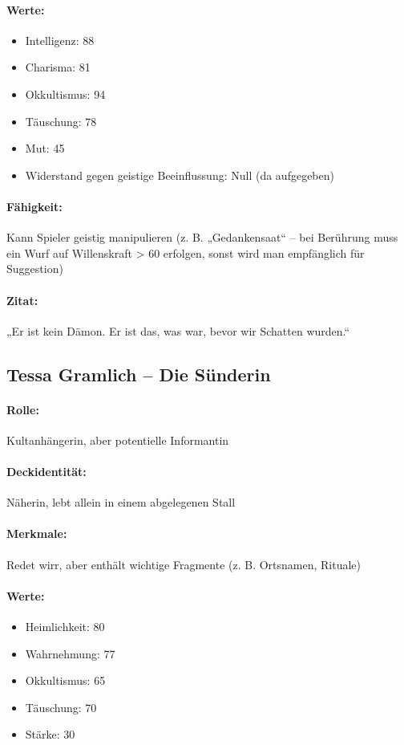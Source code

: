 \paragraph{Werte:}
\begin{itemize}
\item Intelligenz: 88
\item Charisma: 81
\item Okkultismus: 94
\item Täuschung: 78
\item Mut: 45
\item Widerstand gegen geistige Beeinflussung: Null (da aufgegeben)
\end{itemize}
\paragraph{Fähigkeit:} Kann Spieler geistig manipulieren (z. B. „Gedankensaat“ – bei Berührung muss ein Wurf auf Willenskraft > 60 erfolgen, sonst wird man empfänglich für Suggestion)
\paragraph{Zitat:}
„Er ist kein Dämon. Er ist das, was war, bevor wir Schatten wurden.“
\newpage
\subsection{Tessa Gramlich – Die Sünderin}
\paragraph{Rolle:} Kultanhängerin, aber potentielle Informantin
\paragraph{Deckidentität:} Näherin, lebt allein in einem abgelegenen Stall
\paragraph{Merkmale:} Redet wirr, aber enthält wichtige Fragmente (z. B. Ortsnamen, Rituale)
\paragraph{Werte:}
\begin{itemize}
\item Heimlichkeit: 80
\item Wahrnehmung: 77
\item Okkultismus: 65
\item Täuschung: 70
\item Stärke: 30
\end{itemize}
